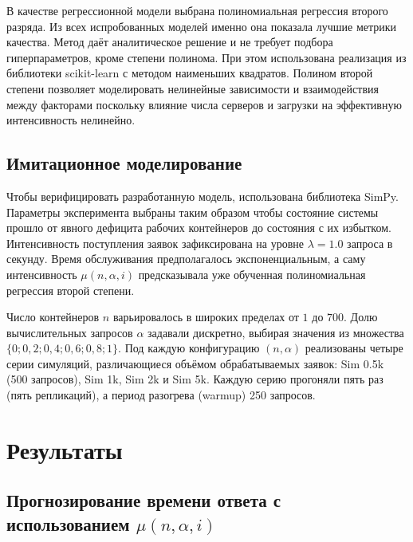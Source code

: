 \documentclass[12pt,a4paper]{article}
\begin{document}
В качестве регрессионной модели выбрана полиномиальная регрессия второго разряда. Из всех испробованных моделей именно она показала лучшие метрики качества. Метод даёт аналитическое решение и не требует подбора гиперпараметров, кроме степени полинома. При этом использована реализация из библиотеки scikit-learn с методом наименьших квадратов. Полином второй степени позволяет моделировать нелинейные зависимости и взаимодействия между факторами поскольку влияние числа серверов и загрузки на эффективную интенсивность нелинейно.

\subsection{Имитационное моделирование}

Чтобы верифицировать разработанную модель, использована библиотека SimPy. Параметры эксперимента выбраны таким образом чтобы состояние системы прошло от явного дефицита рабочих контейнеров до состояния с их избытком. Интенсивность поступления заявок зафиксирована на уровне $\lambda = 1.0$ запроса в секунду. Время обслуживания предполагалось экспоненциальным, а саму интенсивность $\mu(n, \alpha, i)$ предсказывала уже обученная полиномиальная регрессия второй степени.

Число контейнеров $n$ варьировалось в широких пределах от $1$ до $700$. Долю вычислительных запросов $\alpha$ задавали дискретно, выбирая значения из множества $\{0; 0,2; 0,4; 0,6; 0,8; 1\}$. Под каждую конфигурацию $(n, \alpha)$ реализованы четыре серии симуляций, различающиеся объёмом обрабатываемых заявок: Sim 0.5k (500 запросов), Sim 1k, Sim 2k и Sim 5k. Каждую серию прогоняли пять раз (пять репликаций), а период разогрева (warmup) 250 запросов.

\section{Результаты}
\label{sec:results}

\subsection{Прогнозирование времени ответа с использованием $\mu(n,\alpha,i)$}
\end{document}
